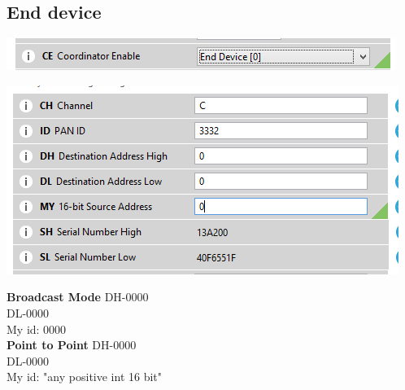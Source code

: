 \documentclass[main.tex]{subfiles}
\begin{document}
\subsection{End device}
\includegraphics[scale=1]{Images/endenb.png}

\includegraphics[scale=1]{Images/atend.png}

\noindent\textbf{Broadcast Mode}
DH-0000\\ 
DL-0000 \\
My id: 0000\\

\noindent\textbf{Point to Point}
DH-0000\\ 
DL-0000\\
My id: "any positive int 16 bit"
\end{document}

